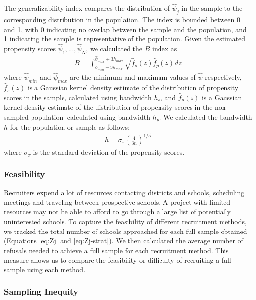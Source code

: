 \documentclass[
  english,
  man,floatsintext]{apa6}
\begin{document}
The generalizability index compares the distribution of \(\hat\psi_j\) in the sample to the corresponding distribution in the population.
The index is bounded between 0 and 1, with 0 indicating no overlap between the sample and the population, and 1 indicating the sample is representative of the population.
Given the estimated propensity scores \(\hat\psi_1,...,\hat\psi_N\), we calculated the \(B\) index as
\begin{align}
B = \int_{\hat\psi_{min}-3h_{max}}^{\hat\psi_{max}+3h_{max}}\sqrt{\hat{f}_s(z)\hat{f}_p(z)}dz
\end{align}
where \(\hat\psi_{min}\) and \(\hat\psi_{max}\) are the minimum and maximum values of \(\hat\psi\) respectively, \(\hat{f}_s(z)\) is a Gaussian kernel density estimate of the distribution of propensity scores in the sample, calculated using bandwidth \(h_s\), and \(\hat{f}_p(z)\) is a Gaussian kernel density estimate of the distribution of propensity scores in the non-sampled population, calculated using bandwidth \(h_p\). We calculated the bandwidth \(h\) for the population or sample as follows:
\begin{align}
h = \sigma_{\pi}\left(\frac{4}{3n}\right)^{1/5}
\end{align}
where \(\sigma_{\pi}\) is the standard deviation of the propensity scores.

\hypertarget{feasibility}{%
\subsubsection{Feasibility}\label{feasibility}}

Recruiters expend a lot of resources contacting districts and schools, scheduling meetings and traveling between prospective schools. A project with limited resources may not be able to afford to go through a large list of potentially uninterested schools. To capture the feasibility of different recruitment methods, we tracked the total number of schools approached for each full sample obtained (Equations \eqref{eq:Zj} and \eqref{eq:Zj-strat}). We then calculated the average number of refusals needed to achieve a full sample for each recruitment method. This measure allows us to compare the feasibility or difficulty of recruiting a full sample using each method.

\hypertarget{sampling-inequity}{%
\subsubsection{Sampling Inequity}\label{sampling-inequity}}
\end{document}
